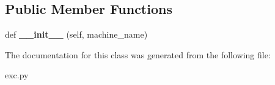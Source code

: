 \subsection*{Public Member Functions}
\begin{DoxyCompactItemize}
\item 
\mbox{\label{classcodar_1_1savanna_1_1exc_1_1_machine_not_found_aac59d9a2636166df83d3260fb7bc8933}} 
def {\bfseries \+\_\+\+\_\+init\+\_\+\+\_\+} (self, machine\+\_\+name)
\end{DoxyCompactItemize}


The documentation for this class was generated from the following file\+:\begin{DoxyCompactItemize}
\item 
exc.\+py\end{DoxyCompactItemize}
